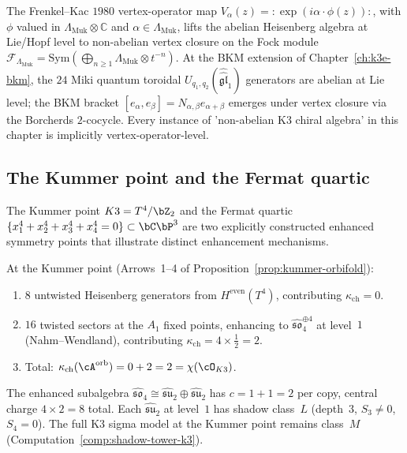 \begin{remark}
\label{rem:k3ca-frenkel-kac}
The Frenkel--Kac $1980$ vertex-operator map $V_\alpha(z)={:}\exp(i\alpha\cdot\phi(z)){:}$, with $\phi$ valued in $\Lambda_{\mathrm{Muk}}\otimes\mathbb{C}$ and $\alpha\in\Lambda_{\mathrm{Muk}}$, lifts the abelian Heisenberg algebra at Lie/Hopf level to non-abelian vertex closure on the Fock module $\mathcal{F}_{\Lambda_{\mathrm{Muk}}}=\mathrm{Sym}(\bigoplus_{n\ge 1}\Lambda_{\mathrm{Muk}}\otimes t^{-n})$. At the BKM extension of Chapter~\ref{ch:k3e-bkm}, the $24$ Miki quantum toroidal $U_{q_1,q_2}(\widehat{\widehat{\mathfrak{gl}}}_1)$ generators are abelian at Lie level; the BKM bracket $[e_\alpha,e_\beta]=N_{\alpha,\beta}e_{\alpha+\beta}$ emerges under vertex closure via the Borcherds $2$-cocycle. Every instance of 'non-abelian K3 chiral algebra' in this chapter is implicitly vertex-operator-level.
\end{remark}

\subsection{The Kummer point and the Fermat quartic}
\label{subsec:k3-kummer-fermat-enhancement}

The Kummer point $K3 = T^4/\bZ_2$ and the Fermat quartic
$\{x_1^4 + x_2^4 + x_3^4 + x_4^4 = 0\} \subset \bC\bP^3$
are two explicitly constructed enhanced symmetry points that
illustrate distinct enhancement mechanisms.

\begin{remark}
\label{rem:k3-kummer-enhancement}
At the Kummer point (Arrows~1--4 of
Proposition~\ref{prop:kummer-orbifold}):
\begin{enumerate}[label=(\roman*)]
\item $8$ untwisted Heisenberg generators from
 $H^{\mathrm{even}}(T^4)$, contributing $\kappa_{\mathrm{ch}} = 0$.
\item $16$ twisted sectors at the $A_1$ fixed points, enhancing
 to $\hat{\mathfrak{so}}_4^{\oplus 4}$ at level~$1$
 (Nahm--Wendland), contributing
 $\kappa_{\mathrm{ch}} = 4 \times \tfrac{1}{2} = 2$.
\item Total: $\kappa_{\mathrm{ch}}(\cA^{\mathrm{orb}}) = 0 + 2 = 2 = \chi(\cO_{K3})$.
\end{enumerate}
The enhanced subalgebra
$\hat{\mathfrak{so}}_4 \cong \hat{\mathfrak{su}}_2 \oplus \hat{\mathfrak{su}}_2$
has $c = 1 + 1 = 2$ per copy, central charge $4 \times 2 = 8$ total.
Each $\hat{\mathfrak{su}}_2$ at level~$1$ has shadow class~$L$ (depth~$3$,
$S_3 \neq 0$, $S_4 = 0$). The full K3 sigma model at the Kummer point
remains class~$M$ (Computation~\ref{comp:shadow-tower-k3}).
\end{remark}

